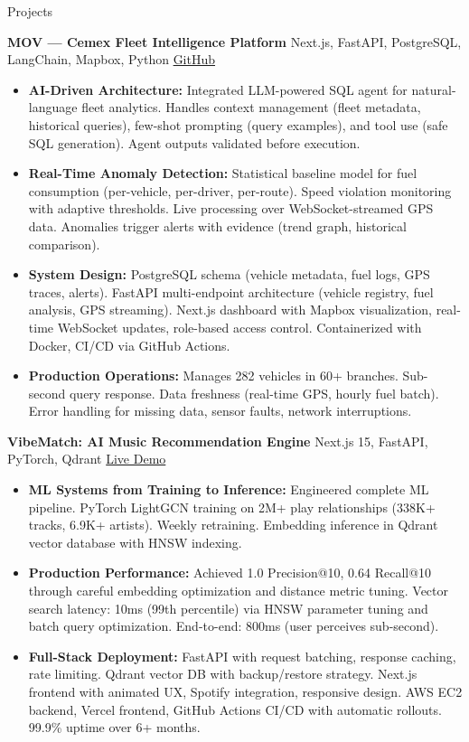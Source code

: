 \documentclass{resume}
\begin{document}
\begin{rSection}{Projects}

\textbf{MOV — Cemex Fleet Intelligence Platform} {Next.js, FastAPI, PostgreSQL, LangChain, Mapbox, Python} \hfill \href{https://github.com/Fraga9/MOV-fleet}{GitHub}
\begin{itemize}
    \item \textbf{AI-Driven Architecture:} Integrated LLM-powered SQL agent for natural-language fleet analytics. Handles context management (fleet metadata, historical queries), few-shot prompting (query examples), and tool use (safe SQL generation). Agent outputs validated before execution.
    \item \textbf{Real-Time Anomaly Detection:} Statistical baseline model for fuel consumption (per-vehicle, per-driver, per-route). Speed violation monitoring with adaptive thresholds. Live processing over WebSocket-streamed GPS data. Anomalies trigger alerts with evidence (trend graph, historical comparison).
    \item \textbf{System Design:} PostgreSQL schema (vehicle metadata, fuel logs, GPS traces, alerts). FastAPI multi-endpoint architecture (vehicle registry, fuel analysis, GPS streaming). Next.js dashboard with Mapbox visualization, real-time WebSocket updates, role-based access control. Containerized with Docker, CI/CD via GitHub Actions.
    \item \textbf{Production Operations:} Manages 282 vehicles in 60+ branches. Sub-second query response. Data freshness (real-time GPS, hourly fuel batch). Error handling for missing data, sensor faults, network interruptions.
\end{itemize}

\textbf{VibeMatch: AI Music Recommendation Engine} {Next.js 15, FastAPI, PyTorch, Qdrant} \hfill \href{https://www.vibematchs.me/}{Live Demo}
\begin{itemize}
    \item \textbf{ML Systems from Training to Inference:} Engineered complete ML pipeline. PyTorch LightGCN training on 2M+ play relationships (338K+ tracks, 6.9K+ artists). Weekly retraining. Embedding inference in Qdrant vector database with HNSW indexing.
    \item \textbf{Production Performance:} Achieved 1.0 Precision@10, 0.64 Recall@10 through careful embedding optimization and distance metric tuning. Vector search latency: 10ms (99th percentile) via HNSW parameter tuning and batch query optimization. End-to-end: 800ms (user perceives sub-second).
    \item \textbf{Full-Stack Deployment:} FastAPI with request batching, response caching, rate limiting. Qdrant vector DB with backup/restore strategy. Next.js frontend with animated UX, Spotify integration, responsive design. AWS EC2 backend, Vercel frontend, GitHub Actions CI/CD with automatic rollouts. 99.9\% uptime over 6+ months.
\end{itemize}


\end{rSection}
\end{document}

